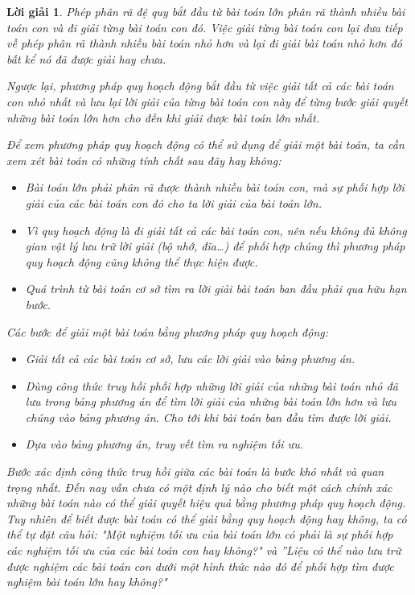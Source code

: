 \documentclass[14pt, a4paper]{article}
\theoremstyle{sltheorem}
\theoremstyle{soltheorem}
\newtheorem*{loigiai}{Lời giải}
\begin{document}
\begin{loigiai}
        Phép phân rã đệ quy bắt đầu từ bài toán lớn phân rã thành nhiều bài toán con và đi giải từng bài toán con đó.
        Việc giải từng bài toán con lại đưa tiếp về phép phân rã thành nhiều bài toán nhỏ hơn và lại đi giải bài toán nhỏ hơn đó bất kể nó đã được giải hay chưa.

        Ngược lại, phương pháp quy hoạch động bắt đầu từ việc giải tất cả các bài toán con nhỏ nhất và lưu lại lời giải của từng bài toán con này
        để từng bước giải quyết những bài toán lớn hơn cho đến khi giải được bài toán lớn nhất.

        Để xem phương pháp quy hoạch động có thể sử dụng để giải một bài toán, ta cần xem xét bài toán có những tính chất sau đây hay không:


        \begin{itemize}
            \item Bài toán lớn phải phân rã được thành nhiều bài toán con, mà sự phối hợp lời giải của các bài
            toán con đó cho ta lời giải của bài toán lớn. 
            \item Vì quy hoạch động là đi giải tất cả các bài toán con, nên nếu không đủ không gian vật lý lưu
            trữ lời giải (bộ nhớ, đĩa…) để phối hợp chúng thì phương pháp quy hoạch động cũng không
            thể thực hiện được. 
            \item Quá trình từ bài toán cơ sở tìm ra lời giải bài toán ban đầu phải qua hữu hạn bước.
        \end{itemize}

        Các bước để giải một bài toán bằng phương pháp quy hoạch động:

        \begin{itemize}
            \item Giải tất cả các bài toán cơ sở, lưu các lời giải vào bảng phương án.
            \item Dùng công thức truy hồi phối hợp những lời giải của những bài toán nhỏ đã lưu trong bảng
            phương án để tìm lời giải của những bài toán lớn hơn và lưu chúng vào bảng phương án. Cho
            tới khi bài toán ban đầu tìm được lời giải.
            \item Dựa vào bảng phương án, truy vết tìm ra nghiệm tối ưu.
        \end{itemize}

        Bước xác định công thức truy hồi giữa các bài toán là bước khó nhất và quan trọng nhất.
        Đến nay vẫn chưa có một định lý nào cho biết một cách chính xác những bài toán nào có thể giải quyết hiệu quả bằng phương pháp quy hoạch động.
        Tuy nhiên để biết được bài toán có thể giải bằng
        quy hoạch động hay không, ta có thể tự đặt câu hỏi: "Một nghiệm tối ưu của bài toán lớn có
        phải là sự phối hợp các nghiệm tối ưu của các bài toán con hay không?" và ”Liệu có thể
        nào lưu trữ được nghiệm các bài toán con dưới một hình thức nào đó để phối hợp tìm
        được nghiệm bài toán lớn hay không?"


\end{loigiai}
\end{document}

